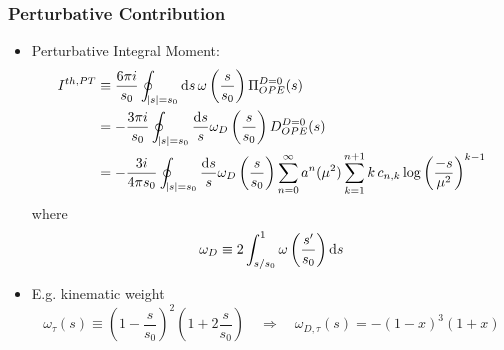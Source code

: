 \documentclass{beamer}
\begin{document}
\begin{frame}
  \frametitle{Perturbative Contribution}
  \begin{itemize}
  \item Perturbative Integral Moment:
    \begin{equation}
      \begin{split}
        I^{th,PT} &\equiv \frac{6 \pi i}{s_0} \oint_{\abs{s}=s_0} \dif s\, \omega\left(\frac{s}{s_0}\right) \Pi_{OPE}^{D=0}(s) \\
        &= -\frac{3 \pi i}{s_0} \oint_{\abs{s}=s_0} \frac{\dif s}{s} \omega_D\left(\frac{s}{s_0}\right) D_{OPE}^{D=0}(s) \\
        &= -\frac{3 i}{4 \pi s_0} \oint_{\abs{s}=s_0} \frac{\dif s}{s}
        \omega_D\left(\frac{s}{s_0}\right) \sum_{n=0}^\infty a^n(\mu^2)
        \sum_{k=1}^{n+1} k\, c_{n,k} \log\left( \frac{-s}{\mu^2} \right)^{k-1}
      \end{split}
    \end{equation}
    where
    \begin{equation}
      \omega_D \equiv 2 \int_{s/s_0}^{1} \omega\left( \frac{s^\prime}{s_0} \right) \dif s
    \end{equation}
  \item E.g. kinematic weight
    \begin{equation}
      \omega_\tau(s) \equiv \left(1 - \frac{s}{s_0}\right)^2\left( 1 + 2 \frac{s}{s_0} \right)
      \quad \Rightarrow \quad
      \omega_{D, \tau}(s) = -(1-x)^3(1+x) 
    \end{equation}
  \end{itemize}
\end{frame}
\end{document}
